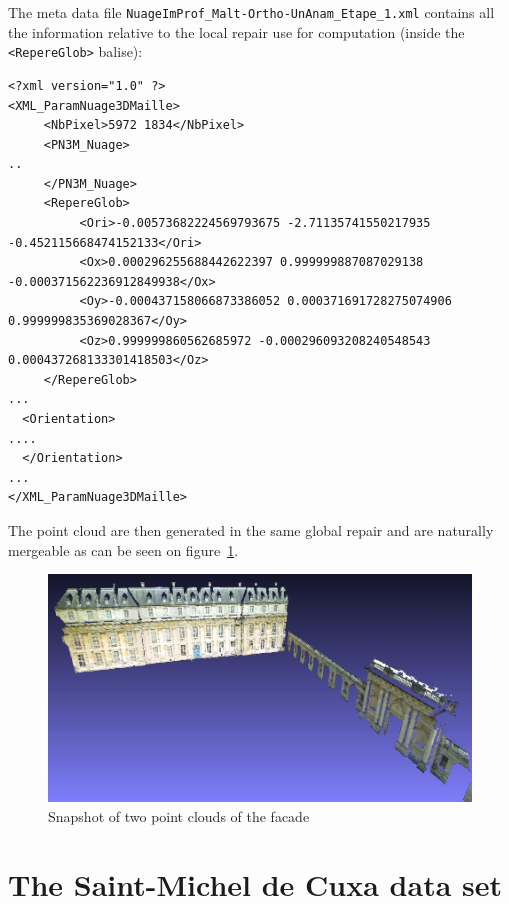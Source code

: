 The meta data file {\tt NuageImProf\_Malt-Ortho-UnAnam\_Etape\_1.xml} contains
all the information relative to the local repair use for computation  (inside
the {\tt <RepereGlob>} balise):

\begin{verbatim}
<?xml version="1.0" ?>
<XML_ParamNuage3DMaille>
     <NbPixel>5972 1834</NbPixel>
     <PN3M_Nuage>
..
     </PN3M_Nuage>
     <RepereGlob>
          <Ori>-0.00573682224569793675 -2.71135741550217935 -0.452115668474152133</Ori>
          <Ox>0.000296255688442622397 0.999999887087029138 -0.000371562236912849938</Ox>
          <Oy>-0.000437158066873386052 0.000371691728275074906 0.999999835369028367</Oy>
          <Oz>0.999999860562685972 -0.000296093208240548543 0.000437268133301418503</Oz>
     </RepereGlob>
...
  <Orientation>
....
  </Orientation>
...
</XML_ParamNuage3DMaille>
\end{verbatim}

The point cloud are then generated in the same global repair and are
naturally mergeable as can be seen on figure~\ref{FIG:TroidD:Vincenne}.


\begin{figure}
\begin{center}
\includegraphics[width=160mm]{FIGS/Vincennes/Vinc3D.jpg}
\end{center}
\caption{Snapshot of two point clouds of the facade}
\label{FIG:TroidD:Vincenne}
\end{figure}


\section{The Saint-Michel de Cuxa data set}

